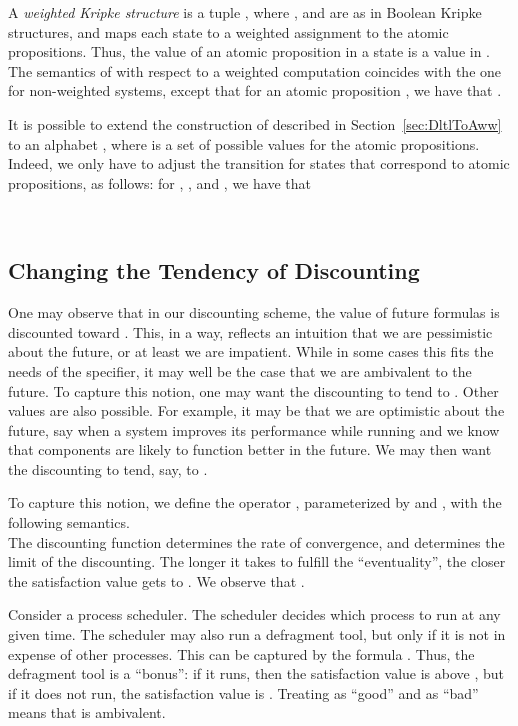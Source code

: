 \documentclass{llncs}
\begin{document}
A {\em weighted Kripke structure} is a tuple , where , and  are as in Boolean Kripke structures, and  maps each state to a weighted assignment to the atomic propositions. Thus, the value  of an atomic proposition  in a state  is a value in . The semantics of  with respect to a weighted computation coincides with the one for non-weighted systems, except that for an atomic proposition , we have that .

It is possible to extend the construction of  described in Section~\ref{sec:DltlToAww} to an alphabet , where  is a set of possible values for the atomic propositions. Indeed, we only have to adjust the transition for states that correspond to atomic propositions, as follows: for , , and , we have that

~
\hspace{.6cm}
~

\subsection{Changing the Tendency of Discounting}\label{sec:DiscountingTendency}
One may observe that in our discounting scheme, the value of future formulas is discounted toward . This, in a way, reflects an intuition that we are pessimistic about the future, or at least we are impatient. While in some cases this fits the needs of the specifier, it may well be the case that we are ambivalent to the future. To capture this notion, one may want the discounting to tend to . Other values are also possible. For example, it may be that we are optimistic about the future, say when a system improves its performance while running and we know that components are likely to function better in the future. We may then want the discounting to tend, say, to . 

To capture this notion, we define the operator , parameterized by 
 and , with the following semantics.
\\ 
The discounting function  determines the rate of convergence, and  determines the limit of the discounting. The longer it takes to fulfill the ``eventuality'', the closer the satisfaction value gets to .
We observe that .
\begin{example}
Consider a process scheduler. The scheduler decides which process to run at any given time. The scheduler may also run a defragment tool, but only if it is not in expense of other processes. This can be captured by the formula . Thus, the defragment tool is a ``bonus'': if it runs, then the satisfaction value is above , but if it does not run, the satisfaction value is . Treating  as ``good'' and  as ``bad'' means that  is ambivalent.
\end{example}
\end{document}
